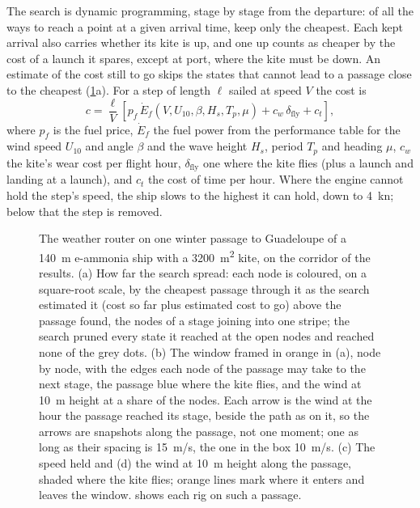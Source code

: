 The search is dynamic programming, stage by stage from the departure: of all the ways to reach a point at a given arrival time, keep only the cheapest. Each kept arrival also carries whether its kite is up, and one up counts as cheaper by the cost of a launch it spares, except at port, where the kite must be down. An estimate of the cost still to go skips the states that cannot lead to a passage close to the cheapest (\cref{fig:router}a). For a step of length $\ell$ sailed at speed $V$ the cost is
\begin{equation}
c = \frac{\ell}{V}\left[p_f\, \dot E_f(V, U_{10}, \beta, H_s, T_p, \mu) + c_w\,\delta_\mathrm{fly} + c_t\right],
\end{equation}
where $p_f$ is the fuel price, $\dot E_f$ the fuel power from the performance table for the wind speed $U_{10}$ and angle $\beta$ and the wave height $H_s$, period $T_p$ and heading $\mu$, $c_w$ the kite's wear cost per flight hour, $\delta_\mathrm{fly}$ one where the kite flies (plus a launch and landing at a launch), and $c_t$ the cost of time per hour. Where the engine cannot hold the step's speed, the ship slows to the highest it can hold, down to \SI{4}{kn}; below that the step is removed.

\begin{figure}[tbp]
\centering
{}
\caption{ The weather router on one winter passage to Guadeloupe of a \SI{140}{m} e-ammonia ship with a \SI{3200}{m^2} kite, on the corridor of the results. (a) How far the search spread: each node is coloured, on a square-root scale, by the cheapest passage through it as the search estimated it (cost so far plus estimated cost to go) above the passage found, the nodes of a stage joining into one stripe; the search pruned every state it reached at the open nodes and reached none of the grey dots. (b) The window framed in orange in (a), node by node, with the edges each node of the passage may take to the next stage, the passage blue where the kite flies, and the wind at \SI{10}{m} height at a share of the nodes. Each arrow is the wind at the hour the passage reached its stage, beside the path as on it, so the arrows are snapshots along the passage, not one moment; one as long as their spacing is \SI{15}{m/s}, the one in the box \SI{10}{m/s}. (c) The speed held and (d) the wind at \SI{10}{m} height along the passage, shaded where the kite flies; orange lines mark where it enters and leaves the window.  shows each rig on such a passage.}
\label{fig:router}
\end{figure}


